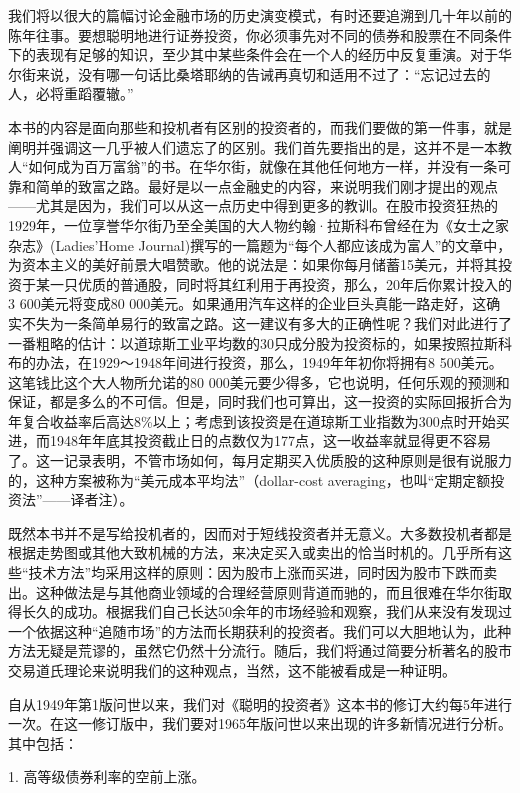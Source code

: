 \documentclass[12pt,oneside]{book}
\begin{document}
我们将以很大的篇幅讨论金融市场的历史演变模式，有时还要追溯到几十年以前的陈年往事。要想聪明地进行证券投资，你必须事先对不同的债券和股票在不同条件下的表现有足够的知识，至少其中某些条件会在一个人的经历中反复重演。对于华尔街来说，没有哪一句话比桑塔耶纳的告诫再真切和适用不过了：“忘记过去的人，必将重蹈覆辙。”

本书的内容是面向那些和投机者有区别的投资者的，而我们要做的第一件事，就是阐明并强调这一几乎被人们遗忘了的区别。我们首先要指出的是，这并不是一本教人“如何成为百万富翁”的书。在华尔街，就像在其他任何地方一样，并没有一条可靠和简单的致富之路。最好是以一点金融史的内容，来说明我们刚才提出的观点——尤其是因为，我们可以从这一点历史中得到更多的教训。在股市投资狂热的1929年，一位享誉华尔街乃至全美国的大人物约翰·拉斯科布曾经在为《女士之家杂志》(Ladies'Home Journal)撰写的一篇题为“每个人都应该成为富人”的文章中，为资本主义的美好前景大唱赞歌。他的说法是：如果你每月储蓄15美元，并将其投资于某一只优质的普通股，同时将其红利用于再投资，那么，20年后你累计投入的3 600美元将变成80 000美元。如果通用汽车这样的企业巨头真能一路走好，这确实不失为一条简单易行的致富之路。这一建议有多大的正确性呢？我们对此进行了一番粗略的估计：以道琼斯工业平均数的30只成分股为投资标的，如果按照拉斯科布的办法，在1929～1948年间进行投资，那么，1949年年初你将拥有8 500美元。这笔钱比这个大人物所允诺的80 000美元要少得多，它也说明，任何乐观的预测和保证，都是多么的不可信。但是，同时我们也可算出，这一投资的实际回报折合为年复合收益率后高达8\%以上；考虑到该投资是在道琼斯工业指数为300点时开始买进，而1948年年底其投资截止日的点数仅为177点，这一收益率就显得更不容易了。这一记录表明，不管市场如何，每月定期买入优质股的这种原则是很有说服力的，这种方案被称为“美元成本平均法”（dollar-cost averaging，也叫“定期定额投资法”——译者注）。

既然本书并不是写给投机者的，因而对于短线投资者并无意义。大多数投机者都是根据走势图或其他大致机械的方法，来决定买入或卖出的恰当时机的。几乎所有这些“技术方法”均采用这样的原则：因为股市上涨而买进，同时因为股市下跌而卖出。这种做法是与其他商业领域的合理经营原则背道而驰的，而且很难在华尔街取得长久的成功。根据我们自己长达50余年的市场经验和观察，我们从来没有发现过一个依据这种“追随市场”的方法而长期获利的投资者。我们可以大胆地认为，此种方法无疑是荒谬的，虽然它仍然十分流行。随后，我们将通过简要分析著名的股市交易道氏理论来说明我们的这种观点，当然，这不能被看成是一种证明。

自从1949年第1版问世以来，我们对《聪明的投资者》这本书的修订大约每5年进行一次。在这一修订版中，我们要对1965年版问世以来出现的许多新情况进行分析。其中包括：

1. 高等级债券利率的空前上涨。
\end{document}
